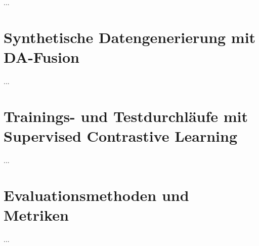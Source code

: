 ...

\section{Synthetische Datengenerierung mit DA-Fusion} \label{sec:synt-gen-da-fusion}

...

\section{Trainings- und Testdurchläufe mit Supervised Contrastive Learning} \label{sec:train-test-supcon}

...

\section{Evaluationsmethoden und Metriken} \label{sec:evaluation}

...